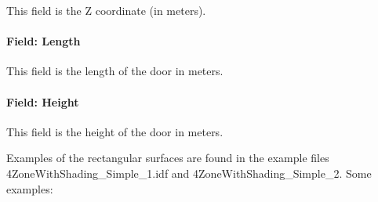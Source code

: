This field is the Z coordinate (in meters).

\paragraph{Field: Length}\label{field-length-15}

This field is the length of the door in meters.

\paragraph{Field: Height}\label{field-height-9}

This field is the height of the door in meters.

Examples of the rectangular surfaces are found in the example files 4ZoneWithShading\_Simple\_1.idf and 4ZoneWithShading\_Simple\_2. Some examples:

